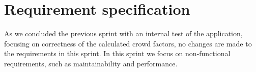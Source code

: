 \section{Requirement specification} \label{sec:s4_reqs}
As we concluded the previous sprint with an internal test of the application, focusing on correctness of the calculated crowd factors, no changes are made to the requirements in this sprint. In this sprint we focus on non-functional requirements, such as maintainability and performance. 


